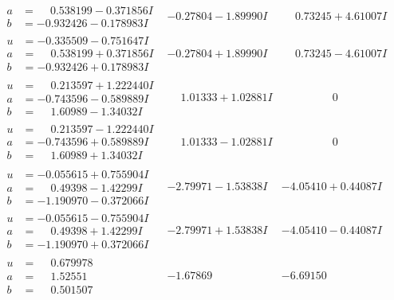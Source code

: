 \documentclass[1p]{elsarticle_modified}
\theoremstyle{definition}
\begin{document}
$$\begin{array}{c|c|c}
\begin{aligned}
a &= \phantom{-}0.538199 - 0.371856 I \\
b &= -0.932426 - 0.178983 I\end{aligned}
 & -0.27804 - 1.89990 I & \phantom{-}0.73245 + 4.61007 I \\ \hline\begin{aligned}
u &= -0.335509 - 0.751647 I \\
a &= \phantom{-}0.538199 + 0.371856 I \\
b &= -0.932426 + 0.178983 I\end{aligned}
 & -0.27804 + 1.89990 I & \phantom{-}0.73245 - 4.61007 I \\ \hline\begin{aligned}
u &= \phantom{-}0.213597 + 1.222440 I \\
a &= -0.743596 - 0.589889 I \\
b &= \phantom{-}1.60989 - 1.34032 I\end{aligned}
 & \phantom{-}1.01333 + 1.02881 I & \phantom{-0.000000 } 0 \\ \hline\begin{aligned}
u &= \phantom{-}0.213597 - 1.222440 I \\
a &= -0.743596 + 0.589889 I \\
b &= \phantom{-}1.60989 + 1.34032 I\end{aligned}
 & \phantom{-}1.01333 - 1.02881 I & \phantom{-0.000000 } 0 \\ \hline\begin{aligned}
u &= -0.055615 + 0.755904 I \\
a &= \phantom{-}0.49398 - 1.42299 I \\
b &= -1.190970 - 0.372066 I\end{aligned}
 & -2.79971 - 1.53838 I & -4.05410 + 0.44087 I \\ \hline\begin{aligned}
u &= -0.055615 - 0.755904 I \\
a &= \phantom{-}0.49398 + 1.42299 I \\
b &= -1.190970 + 0.372066 I\end{aligned}
 & -2.79971 + 1.53838 I & -4.05410 - 0.44087 I \\ \hline\begin{aligned}
u &= \phantom{-}0.679978\phantom{ +0.000000I} \\
a &= \phantom{-}1.52551\phantom{ +0.000000I} \\
b &= \phantom{-}0.501507\phantom{ +0.000000I}\end{aligned}
 & -1.67869\phantom{ +0.000000I} & -6.69150\phantom{ +0.000000I} \\ \hline\begin{aligned}

\end{aligned}
\end{array}$$
\end{document}
